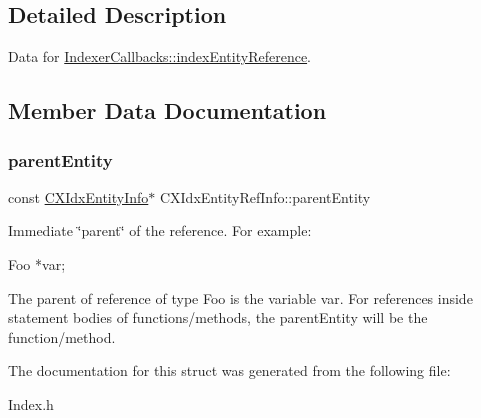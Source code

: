 \subsection{Detailed Description}
Data for \hyperlink{structIndexerCallbacks_a6d93809e7743a590beafa0387ac145dc}{Indexer\+Callbacks\+::index\+Entity\+Reference}. 

\subsection{Member Data Documentation}
\mbox{\label{structCXIdxEntityRefInfo_aa01a3ce2b823d13984eed3ab0676a3b7}} 
\subsubsection{\texorpdfstring{parent\+Entity}{parentEntity}}
{\footnotesize\ttfamily const \hyperlink{structCXIdxEntityInfo}{C\+X\+Idx\+Entity\+Info}$\ast$ C\+X\+Idx\+Entity\+Ref\+Info\+::parent\+Entity}



Immediate \char`\"{}parent\char`\"{} of the reference. For example\+: 


\begin{DoxyCode}
Foo *var;
\end{DoxyCode}


The parent of reference of type \textquotesingle{}Foo\textquotesingle{} is the variable \textquotesingle{}var\textquotesingle{}. For references inside statement bodies of functions/methods, the parent\+Entity will be the function/method. 

The documentation for this struct was generated from the following file\+:\begin{DoxyCompactItemize}
\item 
Index.\+h\end{DoxyCompactItemize}
